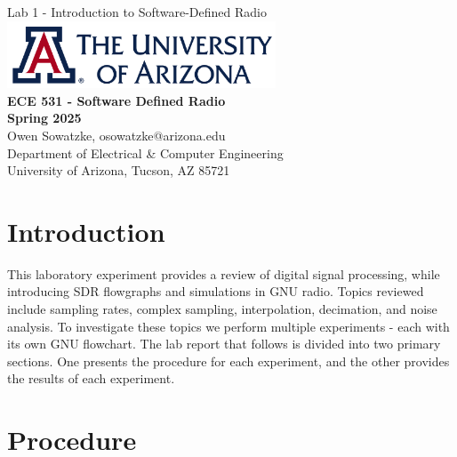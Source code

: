 \documentclass{article}
\begin{document}
\begin{titlepage}
	\centering
	{\huge Lab 1 - Introduction to Software-Defined Radio}\\[0.25 in]
	\includegraphics[width=0.6\textwidth]{ua_logo.png}\\[0.25 in]
	{\large \textbf{ECE 531 - Software Defined Radio\\[0.25 in]
	Spring 2025\\[0.25 in]}}
	{\large Owen Sowatzke, osowatzke@arizona.edu\\[0.05 in]
	Department of Electrical \& Computer Engineering\\[0.05 in]
	University of Arizona, Tucson, AZ 85721\\[0.5 in]}
	\textcolor{blue}{
	\noindent\hrulefill
	\tableofcontents
	\noindent\hrulefill
	}
\end{titlepage}

\setlength{\parindent}{0pt}

\section{Introduction}

This laboratory experiment provides a review of digital signal processing, while introducing SDR flowgraphs and simulations in GNU radio. Topics reviewed include sampling rates, complex sampling, interpolation, decimation, and noise analysis. To investigate these topics we perform multiple experiments - each with its own GNU flowchart. The lab report that follows is divided into two primary sections. One presents the procedure for each experiment, and the other provides the results of each experiment.

\section{Procedure}

\end{document}
